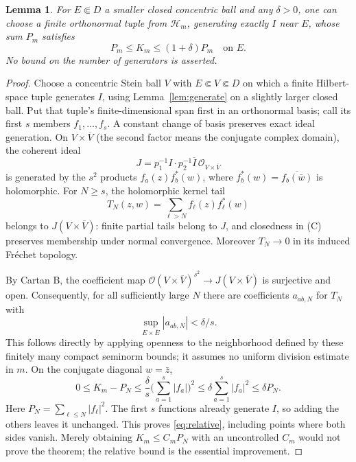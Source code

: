 \documentclass[11pt]{article}
\newcommand{\OO}{\mathcal O}
\newtheorem{lemma}[theorem]{Lemma}
\theoremstyle{definition}
\begin{document}
\begin{lemma}\label{lem:finite}
For $E\Subset D$ a smaller closed concentric ball and any
$\delta>0$, one can choose a finite orthonormal tuple from
$\mathcal H_m$, generating exactly $I$ near $E$, whose sum $P_m$
satisfies
\begin{equation}\label{eq:relative}
 P_m\leq K_m\leq(1+\delta)P_m\quad\text{on }E.
\end{equation}
No bound on the number of generators is asserted.
\end{lemma}
\begin{proof}
Choose a concentric Stein ball $V$ with $E\Subset V\Subset D$
on which a finite Hilbert-space tuple generates $I$, using
Lemma~\ref{lem:generate} on a slightly larger closed ball. Put
that tuple's finite-dimensional span first in an orthonormal basis;
call its first $s$ members $f_1,\ldots,f_s$. A constant change of
basis preserves exact ideal generation. On
$V\times\overline V$ (the second factor means the conjugate complex
domain), the coherent ideal
\[
 J=p_1^{-1}I\cdot p_2^{-1}\overline I\,\OO_{V\times\overline V}
\]
is generated by the $s^2$ products $f_a(z)f_b^*(w)$, where
$f_b^*(w)=\overline{f_b(\bar w)}$ is holomorphic.
For $N\geq s$, the holomorphic kernel tail
\[
 T_N(z,w)=\sum_{\ell>N}f_\ell(z)f_\ell^*(w)
\]
belongs to $J(V\times\overline V)$: finite partial tails belong
to $J$, and closedness in (C) preserves membership under normal
convergence. Moreover $T_N\to0$ in its induced Fr\'echet topology.

By Cartan B, the coefficient map
$\OO(V\times\overline V)^{s^2}\to J(V\times\overline V)$ is
surjective and open. Consequently, for all sufficiently large $N$
there are coefficients $a_{ab,N}$ for $T_N$ with
\[
 \sup_{E\times\overline E}|a_{ab,N}|<\delta/s.
\]
This follows directly by applying openness to the neighborhood
defined by these finitely many compact seminorm bounds; it assumes
no uniform division estimate in $m$.
On the conjugate diagonal $w=\bar z$,
\[
 0\leq K_m-P_N
 \leq\frac\delta s\Big(\sum_{a=1}^s|f_a|\Big)^2
 \leq\delta\sum_{a=1}^s|f_a|^2\leq\delta P_N.
\]
Here $P_N=\sum_{\ell\leq N}|f_\ell|^2$. The first $s$ functions
already generate $I$, so adding the others leaves it unchanged.
This proves \eqref{eq:relative}, including points where both sides
vanish. Merely obtaining $K_m\leq C_mP_N$ with an uncontrolled
$C_m$ would not prove the theorem; the relative bound is the
essential improvement.
\end{proof}
\end{document}
